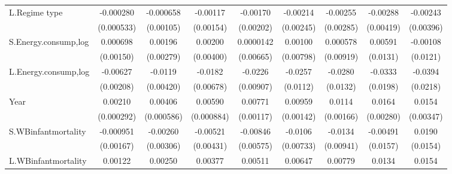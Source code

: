 \begin{table}[htbp]
\begin{tabular}{l*{8}{c}}
L.Regime type       &   -0.000280         &   -0.000658         &    -0.00117         &    -0.00170         &    -0.00214         &    -0.00255         &    -0.00288         &    -0.00243         \\
                    &  (0.000533)         &   (0.00105)         &   (0.00154)         &   (0.00202)         &   (0.00245)         &   (0.00285)         &   (0.00419)         &   (0.00396)         \\
[1em]
S.Energy.consump,log&    0.000698         &     0.00196         &     0.00200         &   0.0000142         &     0.00100         &    0.000578         &     0.00591         &    -0.00108         \\
                    &   (0.00150)         &   (0.00279)         &   (0.00400)         &   (0.00665)         &   (0.00798)         &   (0.00919)         &    (0.0131)         &    (0.0121)         \\
[1em]
L.Energy.consump,log&    -0.00627\sym{***}&     -0.0119\sym{***}&     -0.0182\sym{***}&     -0.0226\sym{**} &     -0.0257\sym{**} &     -0.0280\sym{**} &     -0.0333\sym{*}  &     -0.0394\sym{*}  \\
                    &   (0.00208)         &   (0.00420)         &   (0.00678)         &   (0.00907)         &    (0.0112)         &    (0.0132)         &    (0.0198)         &    (0.0218)         \\
[1em]
Year                &     0.00210\sym{***}&     0.00406\sym{***}&     0.00590\sym{***}&     0.00771\sym{***}&     0.00959\sym{***}&      0.0114\sym{***}&      0.0164\sym{***}&      0.0154\sym{***}\\
                    &  (0.000292)         &  (0.000586)         &  (0.000884)         &   (0.00117)         &   (0.00142)         &   (0.00166)         &   (0.00280)         &   (0.00347)         \\
[1em]
S.WBinfantmortality &   -0.000951         &    -0.00260         &    -0.00521         &    -0.00846         &     -0.0106         &     -0.0134         &    -0.00491         &      0.0190         \\
                    &   (0.00167)         &   (0.00306)         &   (0.00431)         &   (0.00575)         &   (0.00733)         &   (0.00941)         &    (0.0157)         &    (0.0154)         \\
[1em]
L.WBinfantmortality &     0.00122\sym{***}&     0.00250\sym{***}&     0.00377\sym{***}&     0.00511\sym{***}&     0.00647\sym{***}&     0.00779\sym{***}&      0.0134\sym{***}&      0.0154\sym{***}\\

\end{tabular}
\end{table}
